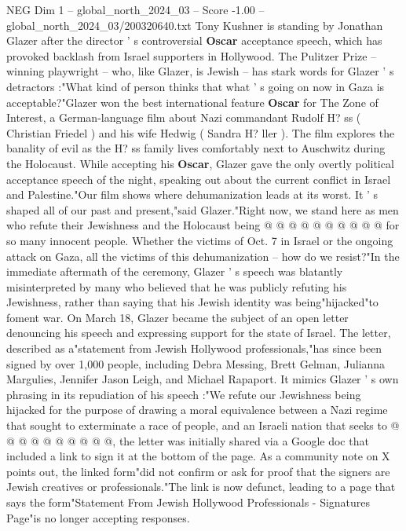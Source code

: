 \begin{textsample}{NEG Dim 1 – global\_north\_2024\_03 – Score -1.00 – global\_north\_2024\_03/200320640.txt}  \label{ex:f1_neg_070}
Tony Kushner is standing by Jonathan Glazer after the director ' s controversial \textbf{Oscar} acceptance speech, which has provoked backlash from Israel supporters in Hollywood.
The Pulitzer Prize -- winning playwright -- who, like Glazer, is Jewish -- has stark words for Glazer ' s detractors :"What kind of person thinks that what ' s going on now in Gaza is acceptable?"Glazer won the best international feature \textbf{Oscar} for The Zone of Interest, a German-language film about Nazi commandant Rudolf H? ss ( Christian Friedel ) and his wife Hedwig ( Sandra H? ller ).
The film explores the banality of evil as the H? ss family lives comfortably next to Auschwitz during the Holocaust.
While accepting his \textbf{Oscar}, Glazer gave the only overtly political acceptance speech of the night, speaking out about the current conflict in Israel and Palestine."Our film shows where dehumanization leads at its worst.
It ' s shaped all of our past and present,"said Glazer."Right now, we stand here as men who refute their Jewishness and the Holocaust being @ @ @ @ @ @ @ @ @ @ for so many innocent people.
Whether the victims of Oct. 7 in Israel or the ongoing attack on Gaza, all the victims of this dehumanization -- how do we resist?"In the immediate aftermath of the ceremony, Glazer ' s speech was blatantly misinterpreted by many who believed that he was publicly refuting his Jewishness, rather than saying that his Jewish identity was being"hijacked"to foment war.
On March 18, Glazer became the subject of an open letter denouncing his speech and expressing support for the state of Israel.
The letter, described as a"statement from Jewish Hollywood professionals,"has since been signed by over 1,000 people, including Debra Messing, Brett Gelman, Julianna Margulies, Jennifer Jason Leigh, and Michael Rapaport.
It mimics Glazer ' s own phrasing in its repudiation of his speech :"We refute our Jewishness being hijacked for the purpose of drawing a moral equivalence between a Nazi regime that sought to exterminate a race of people, and an Israeli nation that seeks to @ @ @ @ @ @ @ @ @ @, the letter was initially shared via a Google doc that included a link to sign it at the bottom of the page.
As a community note on X points out, the linked form"did not confirm or ask for proof that the signers are Jewish creatives or professionals."The link is now defunct, leading to a page that says the form"Statement From Jewish Hollywood Professionals - Signatures Page"is no longer accepting responses.

\end{textsample}
